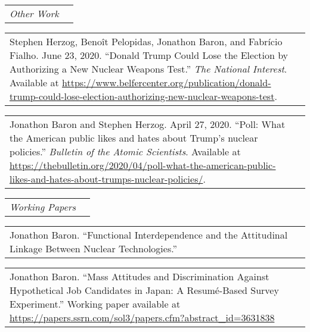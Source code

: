 \documentclass[11pt]{article}
\begin{document}
\vspace{0.13in}

\begin{tabular*}{7.1in}{p{6.925in}p{3cm}}
{\large {\emph{Other Work}}}
\end{tabular*} 
	
\vspace{0.13in}

\begin{tabular*}{7.1in}{p{6.925in}p{3cm}}
Stephen Herzog, Beno\^{i}t Pelopidas, Jonathon Baron, and Fabrício Fialho. June 23, 2020. ``Donald Trump Could Lose the Election by Authorizing a New Nuclear Weapons Test.'' \textit{The National Interest}. Available at \url{https://www.belfercenter.org/publication/donald-trump-could-lose-election-authorizing-new-nuclear-weapons-test}.
\end{tabular*}

\vspace{0.13in}

\begin{tabular*}{7.1in}{p{6.925in}p{3cm}}
Jonathon Baron and Stephen Herzog. April 27, 2020. ``Poll: What the American public likes and hates about Trump's nuclear policies.'' \textit{Bulletin of the Atomic Scientists}. Available at \url{https://thebulletin.org/2020/04/poll-what-the-american-public-likes-and-hates-about-trumps-nuclear-policies/}.
\end{tabular*}

\vspace{0.13in}

\begin{tabular*}{7.1in}{p{6.925in}p{3cm}}
{\large {\emph{Working Papers}}}
\end{tabular*} 

\vspace{0.13in}
\begin{tabular*}{7.1in}{p{6.925in}p{3cm}}
Jonathon Baron. ``Functional Interdependence and the Attitudinal Linkage Between Nuclear Technologies.''
\end{tabular*}

\vspace{0.13in}

\begin{tabular*}{7.1in}{p{6.925in}p{3cm}}
Jonathon Baron. ``Mass Attitudes and Discrimination Against Hypothetical Job Candidates in Japan: A Resum\'{e}-Based Survey Experiment.'' Working paper available at \url{https://papers.ssrn.com/sol3/papers.cfm?abstract_id=3631838}
\end{tabular*}
\end{document}
